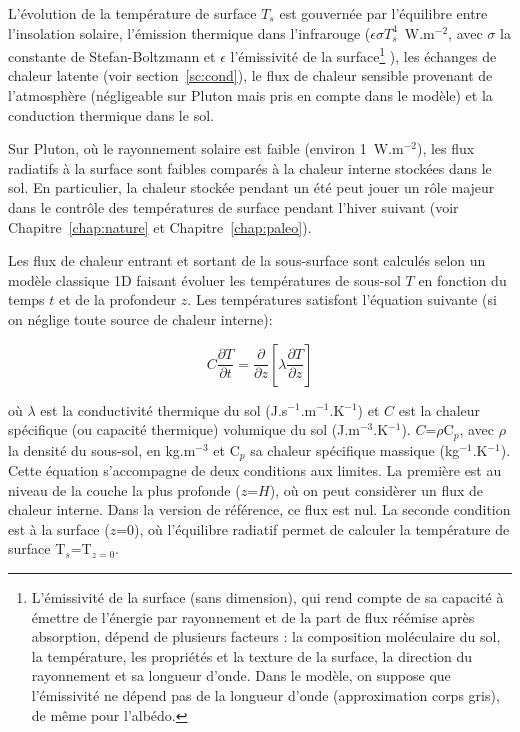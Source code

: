 L’évolution de la température de surface $T_s$ est gouvernée par l’équilibre entre l’insolation solaire, l’émission thermique dans l’infrarouge ($\epsilon\sigma T_s^4$~W.m$^{-2}$, avec $\sigma$ la constante de Stefan-Boltzmann et $\epsilon$ l’émissivité de la surface\footnote{L'émissivité de la surface (sans dimension), qui rend compte de sa capacité à émettre de l'énergie par rayonnement et de la part de flux réémise après absorption, dépend de plusieurs facteurs : la composition moléculaire du sol, la température, les propriétés et la texture de la surface, la direction du rayonnement et sa longueur d'onde. Dans le modèle, on suppose que l’émissivité ne dépend pas de la longueur d'onde (approximation corps gris), de même pour l’albédo.}
), les échanges de chaleur latente (voir section~\ref{sc:cond}), le flux de chaleur sensible provenant de l’atmosphère (négligeable sur Pluton mais pris en compte dans le modèle) et la conduction thermique dans le sol. 

Sur Pluton, où le rayonnement solaire est faible (environ 1~W.m$^{-2}$), les flux radiatifs à la surface sont faibles comparés à la chaleur interne stockées dans le sol. En particulier, la chaleur stockée pendant un été peut jouer un rôle majeur dans le contrôle des températures de surface pendant l’hiver suivant (voir Chapitre~\ref{chap:nature} et Chapitre~\ref{chap:paleo}). 

Les flux de chaleur entrant et sortant de la sous-surface sont calculés selon un modèle classique 1D faisant évoluer les températures de sous-sol $T$ en fonction du temps $t$ et de la profondeur $z$. Les températures satisfont l’équation suivante (si on néglige toute source de chaleur interne):

\begin{equation} 
\label{eq:Heat1D}
C \frac{\partial T}{\partial t} = \frac{\partial }{\partial z} \left[ \lambda \frac{\partial T}{\partial z} \right]
\end{equation}

où $\lambda$ est la conductivité thermique du sol (J.s$^{-1}$.m$^{-1}$.K$^{-1}$) et $C$ est la chaleur spécifique (ou capacité thermique) volumique du sol (J.m$^{-3}$.K$^{-1}$). $C$=$\rho$C$_p$, avec $\rho$ la densité du sous-sol, en kg.m$^{-3}$ et C$_p$ sa chaleur spécifique massique (kg$^{-1}$.K$^{-1}$). Cette équation s’accompagne de deux conditions aux limites. La première est au niveau de la couche la plus profonde ($z$=$H$), où on peut considèrer un flux de chaleur interne. Dans la version de référence, ce flux est nul. La seconde condition est à la surface ($z$=0), où l’équilibre radiatif permet de calculer la température de surface T$_s$=T$_{z=0}$.

